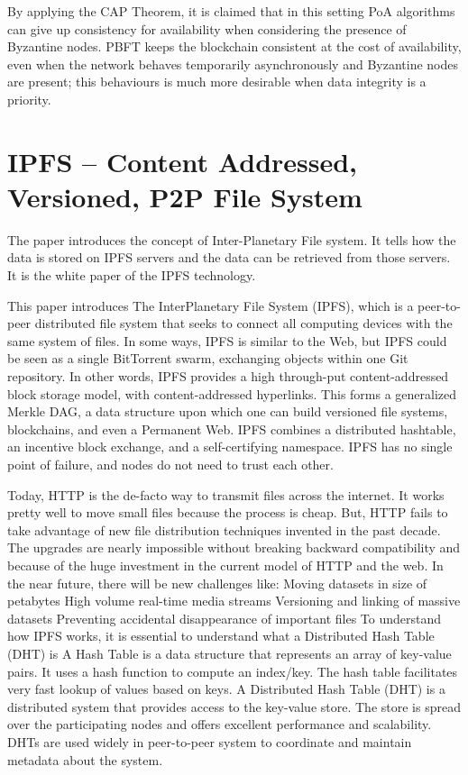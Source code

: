 	      By applying the CAP Theorem, it is claimed that in this setting PoA algorithms can give up consistency for availability when considering the presence of Byzantine nodes. PBFT keeps the blockchain consistent at the cost of availability, even when the network behaves temporarily asynchronously and Byzantine nodes are present; this behaviours is much more desirable when data integrity is a priority. 
	      	              
\section {\textbf{IPFS – Content Addressed, Versioned, P2P File System}}
	      	      
	      The paper introduces the concept of Inter-Planetary File system. It tells how the data is stored on IPFS servers and the data can be retrieved from those servers. It is the white paper of the IPFS technology.
	      	      
	      This paper introduces The InterPlanetary File System (IPFS), which is a peer-to-peer distributed file system that seeks to connect all computing devices with the same system of files. In some ways, IPFS is similar to the Web, but IPFS could be seen as a single BitTorrent swarm, exchanging objects within one Git repository. In other words, IPFS provides a high through-put content-addressed block storage model, with content-addressed hyperlinks. This forms a generalized Merkle DAG, a data structure upon which one can build versioned file systems, blockchains, and even a Permanent Web. IPFS combines a distributed hashtable, an incentive block exchange, and a self-certifying namespace. IPFS has no single point of failure, and nodes do not need to trust each other.
	      
	      Today, HTTP is the de-facto way to transmit files across the internet. It works pretty well to move small files because the process is cheap. But, HTTP fails to take advantage of new file distribution techniques invented in the past decade. The upgrades are nearly impossible without breaking backward compatibility and because of the huge investment in the current model of HTTP and the web. In the near future, there will be new challenges like:
	      Moving datasets in size of petabytes
	      High volume real-time media streams
	      Versioning and linking of massive datasets
	      Preventing accidental disappearance of important files
	      To understand how IPFS works, it is essential to understand what a Distributed Hash Table (DHT) is
	      A Hash Table is a data structure that represents an array of key-value pairs. It uses a hash function to compute an index/key. The hash table facilitates very fast lookup of values based on keys.
	      A Distributed Hash Table (DHT) is a distributed system that provides access to the key-value store. The store is spread over the participating nodes and offers excellent performance and scalability. DHTs are used widely in peer-to-peer system to coordinate and maintain metadata about the system.
	      
